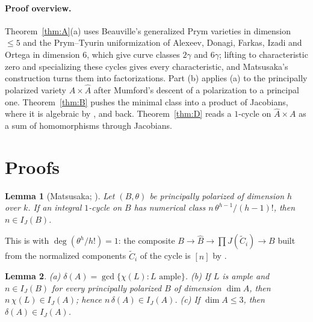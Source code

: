 \documentclass[11pt,a4paper]{article}
\newtheorem{lemma}{Lemma}[section]
\theoremstyle{definition}
\renewcommand{\IJ}{I_J}
\begin{document}
\paragraph{Proof overview.} Theorem~\ref{thm:A}(a) uses Beauville's
generalized Prym varieties in dimension $\le5$ and the Prym--Tyurin
uniformization of Alexeev, Donagi, Farkas, Izadi and Ortega in dimension
$6$, which give curve classes $2\gamma$ and $6\gamma$; lifting to
characteristic zero and specializing these cycles gives every
characteristic, and Matsusaka's construction turns them into factorizations.
Part (b) applies (a) to the principally polarized variety
$A\times\widehat A$ after Mumford's descent of a polarization to a principal
one. Theorem~\ref{thm:B} pushes the minimal class into a product of
Jacobians, where it is algebraic by \cite{BdGF}, and back. Theorem~\ref{thm:D}
reads a $1$-cycle on $\widehat A\times A$ as a sum of homomorphisms through
Jacobians.

\section{Proofs}\label{sec:proofs}

\begin{lemma}[Matsusaka; {\cite[Prop.~3.4]{SS}}]\label{lem:mats}
Let $(B,\theta)$ be principally polarized of dimension $h$ over $k$. If an
integral $1$-cycle on $B$ has numerical class $n\,\theta^{h-1}/(h-1)!$,
then $n\in\IJ(B)$.
\end{lemma}

This is \cite[Prop.~3.4]{SS} with $\deg(\theta^h/h!)=1$: the composite
$B\to\widehat B\to\prod J(\widetilde C_i)\to B$ built from the normalized
components $\widetilde C_i$ of the cycle is $[n]$ by
\cite[eqs.~(3.1)--(3.3)]{SS}.

\begin{lemma}\label{lem:delta}
(a) $\delta(A)=\gcd\{\chi(L):L\text{ ample}\}$. (b) If $L$ is ample and
$n\in\IJ(B)$ for every principally polarized $B$ of dimension $\dim A$, then
$n\,\chi(L)\in\IJ(A)$; hence $n\,\delta(A)\in\IJ(A)$. (c) If
$\dim A\le3$, then $\delta(A)\in\IJ(A)$.
\end{lemma}
\end{document}
